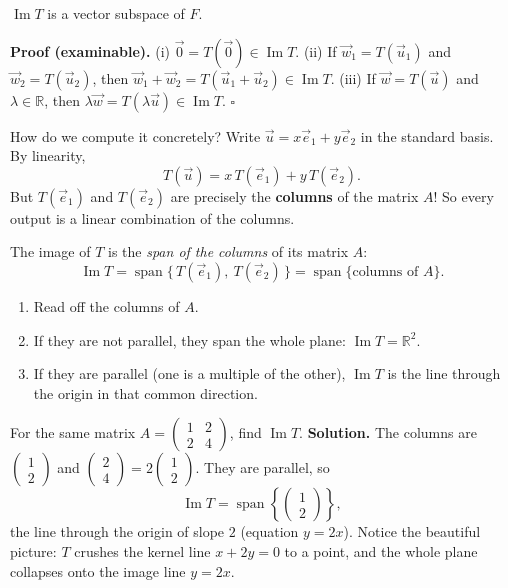 \documentclass[11pt]{article}
\begin{document}
\begin{propriete}
$\operatorname{Im} T$ is a vector subspace of $F$.
\end{propriete}

\textbf{Proof (examinable).} (i) $\vec{0} = T(\vec{0}) \in \operatorname{Im} T$. (ii) If $\vec{w}_1 = T(\vec{u}_1)$ and $\vec{w}_2 = T(\vec{u}_2)$, then $\vec{w}_1 + \vec{w}_2 = T(\vec{u}_1 + \vec{u}_2) \in \operatorname{Im} T$. (iii) If $\vec{w} = T(\vec{u})$ and $\lambda \in \mathbb{R}$, then $\lambda \vec{w} = T(\lambda \vec{u}) \in \operatorname{Im} T$. \hfill$\square$

How do we compute it concretely? Write $\vec{u} = x\vec{e}_1 + y\vec{e}_2$ in the standard basis. By linearity,
\[ T(\vec{u}) = x\,T(\vec{e}_1) + y\,T(\vec{e}_2). \]
But $T(\vec{e}_1)$ and $T(\vec{e}_2)$ are precisely the \textbf{columns} of the matrix $A$! So every output is a linear combination of the columns.

\begin{methode}
The image of $T$ is the \emph{span of the columns} of its matrix $A$:
\[ \operatorname{Im} T = \operatorname{span}\{\, T(\vec{e}_1),\ T(\vec{e}_2) \,\} = \operatorname{span}\{\text{columns of } A\}. \]
\begin{enumerate}
\item Read off the columns of $A$.
\item If they are not parallel, they span the whole plane: $\operatorname{Im} T = \mathbb{R}^2$.
\item If they are parallel (one is a multiple of the other), $\operatorname{Im} T$ is the line through the origin in that common direction.
\end{enumerate}
\end{methode}

\begin{exoresolu}
For the same matrix $A = \begin{pmatrix} 1 & 2 \\ 2 & 4 \end{pmatrix}$, find $\operatorname{Im} T$.
\tcblower
\textbf{Solution.} The columns are $\begin{pmatrix} 1 \\ 2 \end{pmatrix}$ and $\begin{pmatrix} 2 \\ 4 \end{pmatrix} = 2\begin{pmatrix} 1 \\ 2 \end{pmatrix}$. They are parallel, so
\[ \operatorname{Im} T = \operatorname{span}\left\{ \begin{pmatrix} 1 \\ 2 \end{pmatrix} \right\}, \]
the line through the origin of slope $2$ (equation $y = 2x$). Notice the beautiful picture: $T$ crushes the kernel line $x + 2y = 0$ to a point, and the whole plane collapses onto the image line $y = 2x$.
\end{exoresolu}
\end{document}
